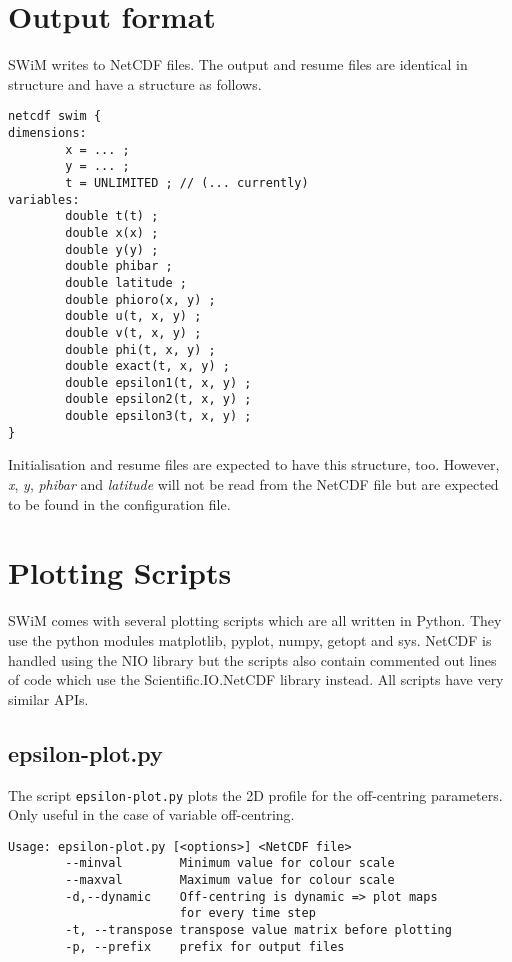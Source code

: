 \documentclass[11pt,a4paper,openright,twoside]{book}
\newcommand{\thecodenospace}{SWiM}
\newcommand{\thecode}{\thecodenospace{ }}
\begin{document}
\section{Output format}
\thecode writes to NetCDF files. The output and resume files are identical in structure and have a structure as follows.

\begin{verbatim}
netcdf swim {
dimensions:
        x = ... ;
        y = ... ;
        t = UNLIMITED ; // (... currently)
variables:
        double t(t) ;
        double x(x) ;
        double y(y) ;
        double phibar ;
        double latitude ;
        double phioro(x, y) ;
        double u(t, x, y) ;
        double v(t, x, y) ;
        double phi(t, x, y) ;
        double exact(t, x, y) ;
        double epsilon1(t, x, y) ;
        double epsilon2(t, x, y) ;
        double epsilon3(t, x, y) ;
}
\end{verbatim}

Initialisation and resume files are expected to have this structure, too. However, \textit{x}, \textit{y}, \textit{phibar}
and \textit{latitude} will not be read from the NetCDF file but are expected to be found in the configuration file.

\section{Plotting Scripts}
\thecode comes with several plotting scripts which are all written in Python. They use the python modules matplotlib,
pyplot, numpy, getopt and sys. NetCDF is handled using the NIO library but the scripts also contain commented out
lines of code which use the Scientific.IO.NetCDF library instead. All scripts have very similar APIs.


\subsection{epsilon-plot.py}
The script \texttt{epsilon-plot.py} plots the 2D profile for the off-centring parameters. Only useful in the case of
variable off-centring.

\begin{verbatim}
Usage: epsilon-plot.py [<options>] <NetCDF file>
        --minval        Minimum value for colour scale
        --maxval        Maximum value for colour scale
        -d,--dynamic    Off-centring is dynamic => plot maps
                        for every time step
        -t, --transpose transpose value matrix before plotting
        -p, --prefix    prefix for output files
\end{verbatim}
\end{document}
